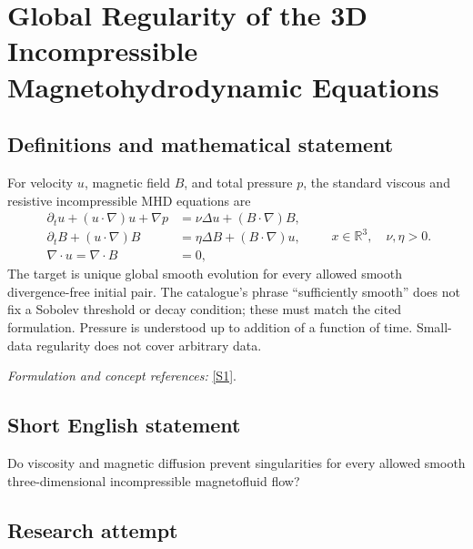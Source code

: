\documentclass[11pt,a4paper]{article}
\newcommand{\R}{\mathbb{R}}
\newcommand{\sref}[2]{\hyperlink{source:#1:#2}{[S#2]}}
\newif\ifshowcatalogue
\newcommand{\cataloguescope}[1]{\ifshowcatalogue
 \paragraph{Exact scope in the supplied catalogue.}
 \begin{quote}\small #1\end{quote}\fi}
\numberwithin{equation}{section}
\begin{document}
\setcounter{section}{108}
\clearpage
\section{\texorpdfstring{Global Regularity of the 3D Incompressible Magnetohydrodynamic Equations}{Global Regularity of the 3D Incompressible Magnetohydrodynamic Equations}}\label{109}
\subsection{Definitions and mathematical statement}
For velocity $u$, magnetic field $B$, and total pressure $p$, the standard viscous and resistive incompressible MHD equations are
\[
 \begin{aligned}
 \partial_tu+(u\cdot\nabla)u+\nabla p&=\nu\Delta u+(B\cdot\nabla)B,\\
 \partial_tB+(u\cdot\nabla)B&=\eta\Delta B+(B\cdot\nabla)u,\\
 \nabla\cdot u=\nabla\cdot B&=0,
 \end{aligned}\qquad x\in\R^3,\quad\nu,\eta>0.
\]
The target is unique global smooth evolution for every allowed smooth divergence-free initial pair. The catalogue's phrase ``sufficiently smooth'' does not fix a Sobolev threshold or decay condition; these must match the cited formulation. Pressure is understood up to addition of a function of time. Small-data regularity does not cover arbitrary data.
\par\smallskip\textit{Formulation and concept references:} \sref{109}{1}.
\cataloguescope{Prove or disprove that every sufficiently smooth divergence-free initial velocity and magnetic field on R\textasciicircum{}3 generates a unique global smooth solution of the standard incompressible three-dimensional MHD system with positive viscosity and magnetic diffusivity.}
\subsection{Short English statement}
Do viscosity and magnetic diffusion prevent singularities for every allowed smooth three-dimensional incompressible magnetofluid flow?
\subsection{Research attempt}
\end{document}
